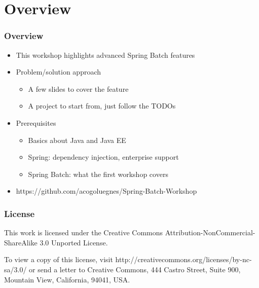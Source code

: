 \section{Overview}

\begin{frame}
\frametitle{Overview}
\begin{itemize}
	\item This workshop highlights advanced Spring Batch features
	\item Problem/solution approach
	\begin{itemize}
		\item A few slides to cover the feature
		\item A project to start from, just follow the TODOs
	\end{itemize}
	\item Prerequisites
	\begin{itemize}
		\item Basics about Java and Java EE
		\item Spring: dependency injection, enterprise support
		\item Spring Batch: what the first workshop covers
	\end{itemize}
	\item https://github.com/acogoluegnes/Spring-Batch-Workshop
\end{itemize}

\end{frame}

\begin{frame}
\frametitle{License}

This work is licensed under the Creative Commons Attribution-NonCommercial-ShareAlike 3.0 
Unported License. 

To view a copy of this license, 
visit http://creativecommons.org/licenses/by-nc-sa/3.0/ or 
send a letter to Creative Commons, 444 Castro Street, Suite 900, Mountain View, 
California, 94041, USA.

\end{frame}
